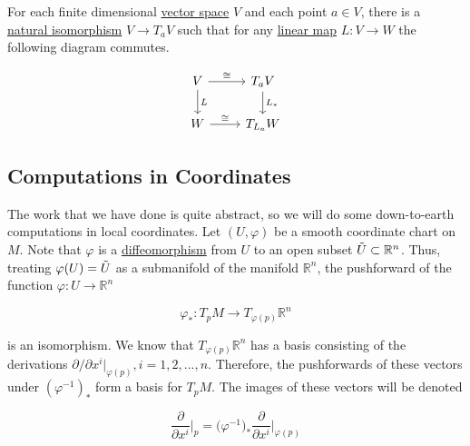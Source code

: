 \documentclass{article}
\newcounter{theorem}[section]
\begin{document}
    \begin{theorem}
      \label{thm:tangent-space-to-a-vector-space}
      For each finite dimensional \hyperref[lin-def:vector-space]{vector space} $V$ and each point $a \in V$, there is a \hyperref[cat-def:natural-isomorphism]{natural isomorphism} $V \rightarrow T_a V$ such that for any \hyperref[lin-def:linear_map]{linear map} $L: V \to W$ the following diagram commutes. 

      \begin{equation}
        \begin{tikzcd}
                V \arrow{r}{\cong} \arrow{d}{L}& T_aV \arrow{d}{L_*} \\
                W \arrow{r}{\cong} & T_{L_a}W
              \end{tikzcd}
      \end{equation}
    \end{theorem}

  \subsection{Computations in Coordinates}

    The work that we have done is quite abstract, so we will do some down-to-earth computations in local coordinates. Let $(U, \varphi)$ be a smooth coordinate chart on $M$. Note that $\varphi$ is a \hyperref[def:diffeomorphism-2]{diffeomorphism} from $U$ to an open subset $\Tilde{U} \subset \mathbb{R}^n$. Thus, treating $\varphi(U) = \Tilde{U}$ as a submanifold of the manifold $\mathbb{R}^n$, the pushforward of the function $\varphi: U \to \mathbb{R}^n$

      \begin{equation}
        \varphi_* : T_p M \to T_{\varphi(p)} \mathbb{R}^n
      \end{equation}

    is an isomorphism. We know that $T_{\varphi(p)} \mathbb{R}^n$ has a basis consisting of the derivations $\partial /\partial x^i \big|_{\varphi(p)}, i = 1, 2, ..., n$. Therefore, the pushforwards of these vectors under $(\varphi^{-1})_*$ form a basis for $T_p M$. The images of these vectors will be denoted

      \begin{equation}
        \frac{\partial}{\partial x^i} \bigg|_p = \big( \varphi^{-1} \big)_* \frac{\partial}{\partial x^i} \bigg|_{\varphi(p)}
      \end{equation}
\end{document}
